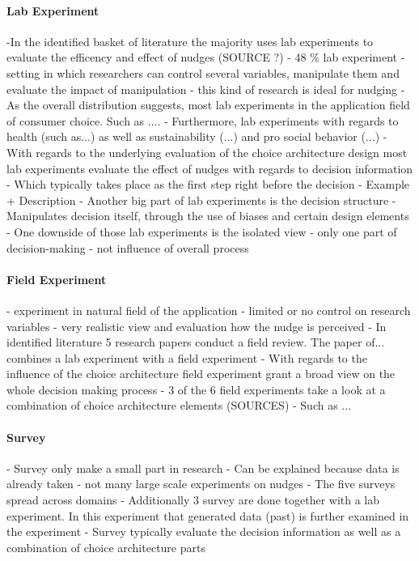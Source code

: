 \paragraph{Lab Experiment} %
 -In the identified basket of literature the majority uses lab experiments to evaluate the efficency and effect of nudges (SOURCE ?)
 - 48 \% lab experiment
 - setting in which researchers can control several variables, manipulate them and evaluate the impact of manipulation
 - this kind of research is ideal for nudging
 - As the overall distribution suggests, most lab experiments in the application field of consumer choice. Such as ....
 - Furthermore, lab experiments with regards to health (such as...) as well as sustainability (...) and pro social behavior (...)
 - With regards to the underlying evaluation of the choice architecture design most lab experiments evaluate the effect of nudges with regards to decision information
 - Which typically takes place as the first step right before the decision
 - Example + Description
 - Another big part of lab experiments is the decision structure
 - Manipulates decision itself, through the use of biases and certain design elements
 - One downside of those lab experiments is the isolated view
 - only one part of decision-making
 - not influence of overall process
\paragraph{Field Experiment} %
- experiment in natural field of the application
- limited or no control on research variables
- very realistic view and evaluation how the nudge is perceived
- In identified literature 5 research papers conduct a field review. The paper of... combines a lab experiment with a field experiment
- With regards to the influence of the choice architecture field experiment grant a broad view on the whole decision making process
- 3 of the 6 field experiments take a look at a combination of choice architecture elements (SOURCES)
- Such as ... 
\paragraph{Survey} %
- Survey only make a small part in research
- Can be explained because data is already taken - not many large scale experiments on nudges
- The five surveys spread across domains
- Additionally 3 survey are done together with a lab experiment. In this experiment that generated data (past) is further examined in the experiment
- Survey typically evaluate the decision information as well as a combination of choice architecture parts
